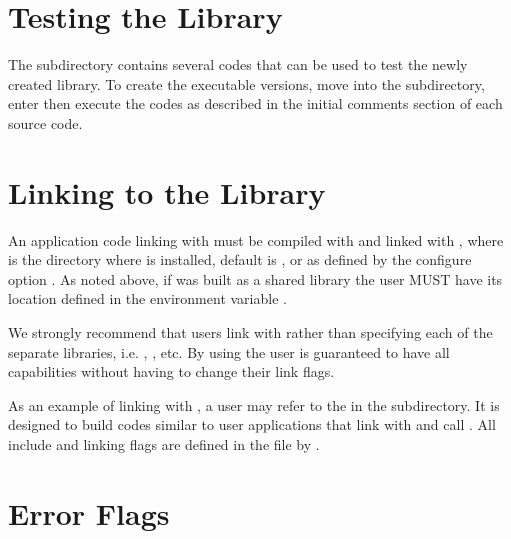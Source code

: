 
\section{Testing the Library} 

The  subdirectory contains several codes that can be used to test
the newly created \hypre{} library.  To create the executable versions, move
into the  subdirectory, enter  then execute the codes as
described in the initial comments section of each source code.


\section{Linking to the Library}

An application code linking with \hypre{} must be compiled with
 and linked with , where
 is the directory where \hypre{} is installed, default is
, or as defined by the configure option . As
noted above, if \hypre{} was built as a shared library the user MUST have its
location defined in the environment variable .

We strongly recommend that users link with  rather than
specifying each of the separate \hypre{} libraries, i.e.
, , etc.  By using
 the user is guaranteed to have all capabilities without having
to change their link flags.

As an example of linking with \hypre{}, a user may refer to the 
in the  subdirectory.  It is designed to build codes similar to
user applications that link with and call \hypre{}.  All include and linking
flags are defined in the  file by .


\section{Error Flags}

